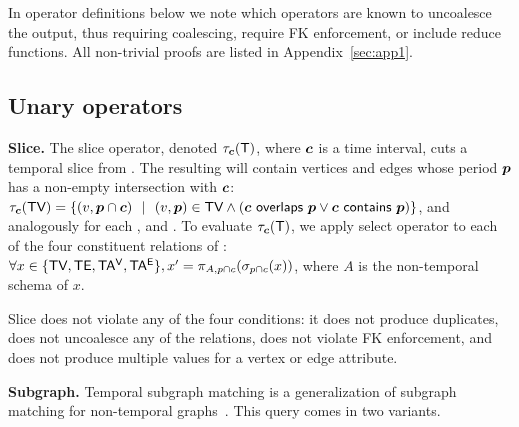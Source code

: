 
In operator definitions below we note which operators are known to
uncoalesce the output, thus requiring coalescing, require FK
enforcement, or include reduce functions.  All non-trivial proofs are
listed in Appendix~\ref{sec:app1}.

\subsection{Unary operators}
\label{sec:algebra:unary}


{\bf Slice.}  The slice operator, denoted $\tau_{\boldsymbol{c}}(\mathsf{T})$, where
$\boldsymbol{c}$ is a time interval, cuts a temporal slice from \ttt. The
resulting \tg will contain vertices and edges whose period $\boldsymbol{p}$ has a
non-empty intersection with $\boldsymbol{c}$: $\tau_{\boldsymbol{c}}(\textsf{TV}) = \{ (v, \boldsymbol{p} \cap
\boldsymbol{c})~~|~~(v, \boldsymbol{p}) \in \textsf{TV} \wedge (\boldsymbol{c}~\mathsf{overlaps}~\boldsymbol{p} \vee
\boldsymbol{c}~\mathsf{contains}~\boldsymbol{p}) \}$, and analogously for each \te, \tav and
\tae.  To evaluate $\tau_{\boldsymbol{c}}(\mathsf{T})$, we apply select operator to
each of the four constituent relations of \tve: $\forall x \in
\{\textsf{TV},\textsf{TE},\mathsf{TA^{V}},\mathsf{TA^{E}} \}, x' = \pi_{A,p \cap c}(\sigma_{p \cap c} (x))$,
where $A$ is the non-temporal schema of $x$.


Slice does not violate any of the four conditions: it does not produce
duplicates, does not uncoalesce any of the \tve relations, does not
violate FK enforcement, and does not produce multiple values for a
vertex or edge attribute.


{\bf Subgraph.}  Temporal subgraph matching is a generalization of
subgraph matching for non-temporal graphs~\cite{Wood2012}.  This query
comes in two variants.

